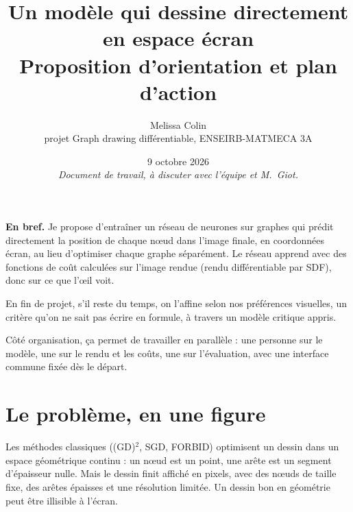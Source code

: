 \documentclass[11pt,a4paper]{article}
\title{\textbf{Un modèle qui dessine directement en espace écran}\\[2pt]
\large Proposition d'orientation et plan d'action}
\author{Melissa Colin\\\small projet \og Graph drawing différentiable\fg{}, ENSEIRB-MATMECA 3A}
\date{9 octobre 2026\\\small\emph{Document de travail, à discuter avec l'équipe et M.~Giot.}}
\begin{document}
\maketitle

\begin{resume}
\textbf{En bref.} Je propose d'entraîner un réseau de neurones sur graphes qui prédit directement la position de chaque nœud dans l'image finale, en coordonnées écran, au lieu d'optimiser chaque graphe séparément. Le réseau apprend avec des fonctions de coût calculées sur l'image rendue (rendu différentiable par SDF), donc sur ce que l'œil voit.

En fin de projet, s'il reste du temps, on l'affine selon nos préférences visuelles, un critère qu'on ne sait pas écrire en formule, à travers un modèle critique appris.

Côté organisation, ça permet de travailler en parallèle : une personne sur le modèle, une sur le rendu et les coûts, une sur l'évaluation, avec une interface commune fixée dès le départ.
\end{resume}

\section{Le problème, en une figure}

Les méthodes classiques ((GD)$^2$, SGD, FORBID) optimisent un dessin dans un espace géométrique continu : un nœud est un point, une arête est un segment d'épaisseur nulle. Mais le dessin finit affiché en pixels, avec des nœuds de taille fixe, des arêtes épaisses et une résolution limitée. Un dessin \og bon\fg{} en géométrie peut être illisible à l'écran.

\begin{center}
\end{center}
\end{document}
